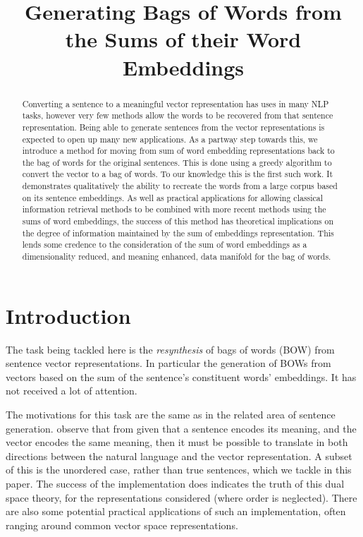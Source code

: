 \documentclass{llncs}
\title{Generating Bags of Words from the Sums of their Word Embeddings}
\author{}
\begin{document}
\maketitle

\begin{abstract}
Converting a sentence to a meaningful vector representation has uses in many NLP tasks, however very few methods allow the words to be recovered from that sentence representation. Being able to generate sentences from the vector representations is expected to open up many new applications. As a partway step towards this, we introduce a method for moving from sum of word embedding representations back to the bag of words for the original sentences. This is done using a greedy algorithm to convert the vector to a bag of words. To our knowledge this is the first such work. It demonstrates qualitatively the ability to recreate the words from a large corpus based on its sentence embeddings.
As well as practical applications for allowing classical information retrieval methods to be combined with more recent methods using the sums of word embeddings, the success of this method has theoretical implications on the degree of information maintained by the sum of embeddings representation. This lends some credence to the consideration of the sum of word embeddings as a dimensionality reduced, and meaning enhanced, data manifold for the bag of words.  
\end{abstract}

\section{Introduction} \label{intro}


The task being tackled here is the \emph{resynthesis} of bags of words (BOW) from sentence vector representations. In particular the generation of BOWs from vectors based on the sum of the sentence's constituent words' embeddings. It has not received a lot of attention.

The motivations for this task are the same as in the related area of sentence generation. \textcite{Dinu2014CompositionalGeneration} observe that from given that a sentence encodes its meaning, and the vector encodes the same meaning, then it must be possible to translate in both directions between the natural language and the vector representation. A subset of this is the unordered case, rather than true sentences, which we tackle in this paper. The success of the implementation does indicates the truth of this dual space theory, for the representations considered (where order is neglected). There are also some potential practical applications of such an implementation, often ranging around common vector space representations.
\end{document}
